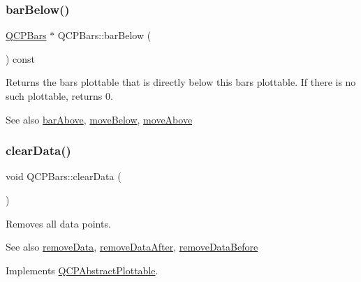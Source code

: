 \subsubsection{\texorpdfstring{bar\+Below()}{barBelow()}}
{\footnotesize\ttfamily \hyperlink{class_q_c_p_bars}{Q\+C\+P\+Bars} $\ast$ Q\+C\+P\+Bars\+::bar\+Below (\begin{DoxyParamCaption}{ }\end{DoxyParamCaption}) const\hspace{0.3cm}{\ttfamily [inline]}}

Returns the bars plottable that is directly below this bars plottable. If there is no such plottable, returns 0.

\begin{DoxySeeAlso}{See also}
\hyperlink{class_q_c_p_bars_ab97f2acd9f6cb40d2cc3c33d278f0e78}{bar\+Above}, \hyperlink{class_q_c_p_bars_a69fc371346980f19177c3d1ecdad78ee}{move\+Below}, \hyperlink{class_q_c_p_bars_ac22e00a6a41509538c21b04f0a57318c}{move\+Above} 
\end{DoxySeeAlso}
\hypertarget{class_q_c_p_bars_a11dbbd707132f07f862dff13c5789c2b}{}\label{class_q_c_p_bars_a11dbbd707132f07f862dff13c5789c2b} 
\subsubsection{\texorpdfstring{clear\+Data()}{clearData()}}
{\footnotesize\ttfamily void Q\+C\+P\+Bars\+::clear\+Data (\begin{DoxyParamCaption}{ }\end{DoxyParamCaption})\hspace{0.3cm}{\ttfamily [virtual]}}

Removes all data points. \begin{DoxySeeAlso}{See also}
\hyperlink{class_q_c_p_bars_a1fe9bcb57d670defea1bb65cadf43765}{remove\+Data}, \hyperlink{class_q_c_p_bars_a99de6e7abbbf03fb41fa604c7f08aa8b}{remove\+Data\+After}, \hyperlink{class_q_c_p_bars_a9d12779a3fad4820aad2c428f368298d}{remove\+Data\+Before} 
\end{DoxySeeAlso}


Implements \hyperlink{class_q_c_p_abstract_plottable_a86e5b8fd4b6ff4f4084e7ea4c573fc53}{Q\+C\+P\+Abstract\+Plottable}.

\hypertarget{class_q_c_p_bars_ac22e00a6a41509538c21b04f0a57318c}{}\label{class_q_c_p_bars_ac22e00a6a41509538c21b04f0a57318c} 
